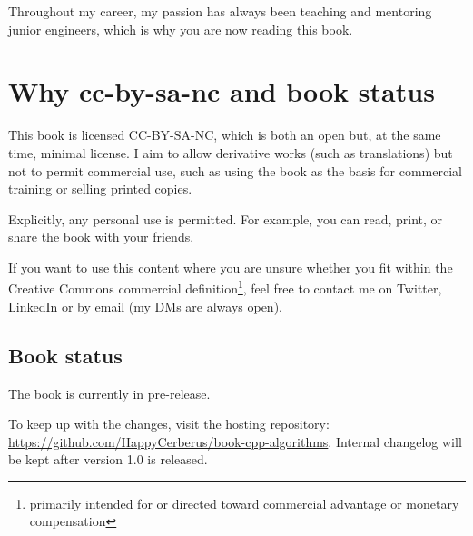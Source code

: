 Throughout my career, my passion has always been teaching and mentoring junior engineers, which is why you are now reading this book.

\section*{Why cc-by-sa-nc and book status}

This book is licensed CC-BY-SA-NC, which is both an open but, at the same time, minimal license. I aim to allow derivative works (such as translations) but not to permit commercial use, such as using the book as the basis for commercial training or selling printed copies.

Explicitly, any personal use is permitted. For example, you can read, print, or share the book with your friends.

If you want to use this content where you are unsure whether you fit within the Creative Commons commercial definition\footnote{primarily intended for or directed toward commercial advantage or monetary compensation}, feel free to contact me on Twitter, LinkedIn or by email (my DMs are always open).

\subsection*{Book status}

The book is currently in pre-release.

To keep up with the changes, visit the hosting repository: \url{https://github.com/HappyCerberus/book-cpp-algorithms}. Internal changelog will be kept after version 1.0 is released.